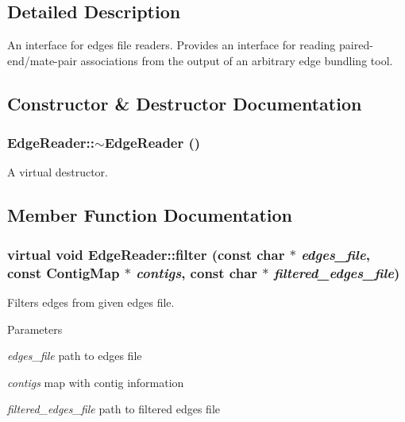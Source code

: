 \subsection{Detailed Description}
An interface for edges file readers. Provides an interface for reading paired-\/end/mate-\/pair associations from the output of an arbitrary edge bundling tool. 

\subsection{Constructor \& Destructor Documentation}
\hypertarget{classEdgeReader_ab3378e9200f9da264cbc2d552c56ad1f}{
\subsubsection[{$\sim$EdgeReader}]{\setlength{\rightskip}{0pt plus 5cm}EdgeReader::$\sim$EdgeReader ()}}
\label{classEdgeReader_ab3378e9200f9da264cbc2d552c56ad1f}
A virtual destructor. 

\subsection{Member Function Documentation}
\hypertarget{classEdgeReader_a422beb33051ce84d62a600325aa058e1}{
\subsubsection[{filter}]{\setlength{\rightskip}{0pt plus 5cm}virtual void EdgeReader::filter (const char $\ast$ {\em edges\_\-file}, \/  const {\bf ContigMap} $\ast$ {\em contigs}, \/  const char $\ast$ {\em filtered\_\-edges\_\-file})}}
\label{classEdgeReader_a422beb33051ce84d62a600325aa058e1}


Filters edges from given edges file. 
\begin{DoxyParams}{Parameters}
\item[{\em edges\_\-file}]path to edges file \item[{\em contigs}]map with contig information \item[{\em filtered\_\-edges\_\-file}]path to filtered edges file \end{DoxyParams}


